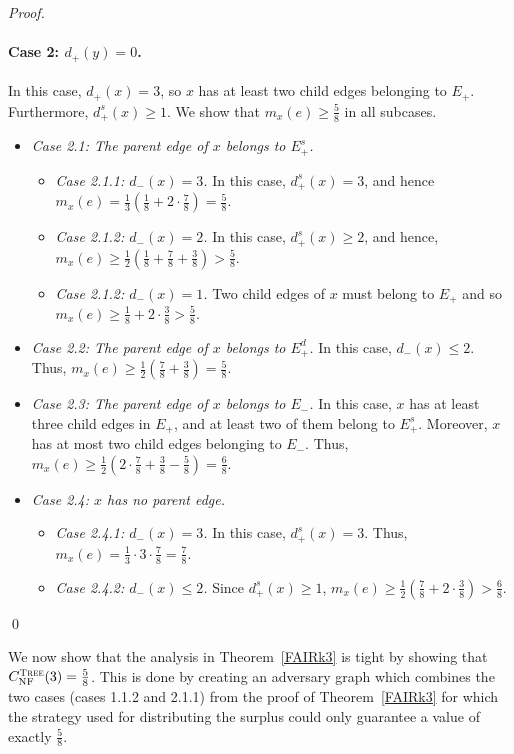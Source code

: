 \documentclass[smallextended]{svjour3}
\DeclareMathOperator{\NFm}{NF}
\begin{document}
\begin{proof}
\paragraph{Case 2: $d_{+}(y)=0$.} In this case, $d_+(x)=3$, so $x$ has at least two child edges belonging to $E_+$. 
Furthermore, $d_+^s(x) \geq 1$.
We show that $m_x(e) \geq \frac58$ in all subcases.
\begin{itemize}
\item {\em Case 2.1: The parent edge of $x$ belongs to $E_+^s$.}
\begin{itemize}
\item {\em Case 2.1.1: $d_-(x)=3$.} In this case, $d_+^s(x)=3$, and hence $m_x(e)=\frac{1}{3}(\frac{1}{8}+2\cdot \frac{7}{8})=\frac{5}{8}$.
\item {\em Case 2.1.2: $d_-(x)= 2$.} In this case, $d_+^s(x)\geq2$, and hence, $m_x(e)\geq \frac{1}{2}(\frac{1}{8}+\frac{7}{8}+\frac{3}{8})> \frac{5}{8}$.
\item {\em Case 2.1.2: $d_-(x)= 1$.} Two child edges of $x$ must belong to $E_+$ and so $m_x(e)\geq \frac{1}{8}+2\cdot \frac{3}{8}> \frac{5}{8}$.
\end{itemize}
\item {\em Case 2.2: The parent edge of $x$ belongs to $E_+^d$.}
In this case, $d_-(x) \leq 2$. Thus, $m_x(e) \geq \frac12(\frac78 + \frac38) = \frac58$.

\item {\em Case 2.3: The parent edge of $x$ belongs to $E_-$.} In this case, $x$ has at least three child edges in $E_+$, and at least two of them belong to $E_+^s$. Moreover, $x$ has at most two child edges belonging to $E_-$. Thus, $m_x(e)\geq \frac{1}{2}(2\cdot\frac{7}{8}+ \frac38-\frac{5}{8})=\frac{6}{8}$.
\item {\em Case 2.4: $x$ has no parent edge.}
  \begin{itemize}
  \item {\em Case 2.4.1: $d_-(x) = 3$.}
    In this case, $d_+^s(x) = 3$.
    Thus, $m_x(e) = \frac13 \cdot 3 \cdot \frac78 = \frac78$.
  \item {\em Case 2.4.2: $d_-(x) \leq 2$.} 
Since $d_+^s(x) \geq 1$, $m_x(e) \geq \frac{1}{2}(\frac78 + 2 \cdot \frac38) > \frac68$.
  \end{itemize}
\end{itemize}
\qed\end{proof}

We now show that the analysis in Theorem~\ref{FAIRk3} is tight by showing that $C_{\NFm}^{\text{{\sc Tree}}}(3)=\frac{5}{8}$. This is done by creating an adversary graph which combines the two cases (cases 1.1.2 and 2.1.1) from the proof of Theorem~\ref{FAIRk3} for which the strategy used for distributing the surplus could only guarantee a value of exactly $\frac{5}{8}$.
\end{document}
